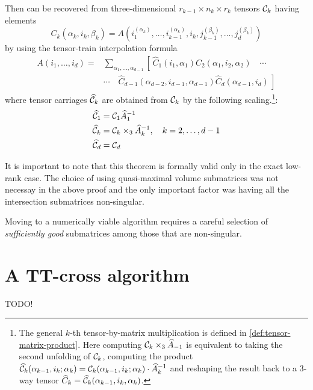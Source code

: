 \begin{Teo}
  Then \A can be recovered from three-dimensional $r_{k-1} \times n_k \times r_k$ tensors $\mathcal{C}_k$ having elements
  \begin{equation*}
    C_k(\alpha_k,i_k,\beta_k) = A(i_1^{(\alpha_k)},\ldots,i_{k-1}^{(\alpha_k)},i_k,j_{k-1}^{(\beta_k)},\ldots,j_d^{(\beta_k)})
  \end{equation*}
  by using the tensor-train interpolation formula
  \begin{align}
    A(i_1,\ldots,i_d) =& \sum_{\alpha_1,\ldots,\alpha_{d-1}} \left[ \, \hat{C}_1(i_1,\alpha_1) \hat{C}_2(\alpha_1,i_2,\alpha_2) \quad \cdots \right. \nonumber \\
    &\cdots \quad \left. \hat{C}_{d-1}(\alpha_{d-2},i_{d-1},\alpha_{d-1}) \hat{C}_d(\alpha_{d-1},i_d) \, \right]
  \end{align}
  where tensor carriages $\widehat{\mathcal{C}}_k$ are obtained from $\mathcal{C}_k$ by the following scaling.\footnote{The general $k$-th tensor-by-matrix multiplication is defined in \ref{def:tensor-matrix-product}. Here computing $\mathcal{C}_k \times_3 \widehat{A}_{-1}$ is equivalent to taking the second unfolding of $\mathcal{C}_k$, computing the product $\widehat{\mathcal{C}}_k(\alpha_{k-1},i_k;\alpha_k) = \mathcal{C}_k(\alpha_{k-1},i_k;\alpha_k) \cdot \widehat{A}_k^{-1}$ and reshaping the result back to a 3-way tensor $\widehat{C}_k = \widehat{\mathcal{C}}_k(\alpha_{k-1},i_k,\alpha_k)$.}:
  \begin{align}
    \widehat{\mathcal{C}}_1 &= \mathcal{C}_1 \widehat{A}_1^{-1} \nonumber \\
    \widehat{\mathcal{C}}_k &= \mathcal{C}_k \times_3 \widehat{A}_k^{-1}, \quad k = 2, \ldots, d-1 \\
    \widehat{\mathcal{C}}_d &= \mathcal{C}_d \nonumber
  \end{align}
\end{Teo}

It is important to note that this theorem is formally valid only in the exact low-rank case. The choice of using quasi-maximal volume submatrices was not necessay in the above proof and the only important factor was having all the intersection submatrices non-singular.

Moving to a numerically viable algorithm requires a careful selection of \emph{sufficiently good} submatrices among those that are non-singular.

\section{A TT-cross algorithm}
TODO!


